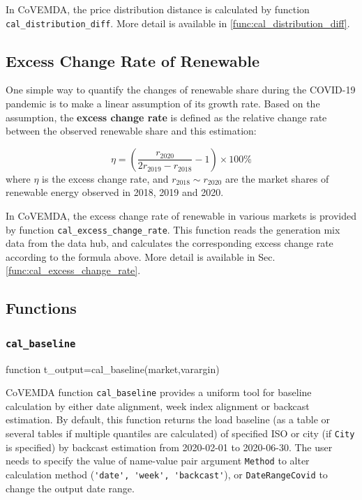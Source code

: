 \documentclass[10pt]{article}
\newcommand{\covemda}{CoVEMDA}
\numberwithin{equation}{section}
\numberwithin{table}{section}
\numberwithin{figure}{section}
\begin{document}
In \covemda{}, the price distribution distance is calculated by function \verb!cal_distribution_diff!. More detail is available in \ref{func:cal_distribution_diff}.

\subsection{Excess Change Rate of Renewable}\label{subsec:excess_change_rate}

One simple way to quantify the changes of renewable share during the COVID-19 pandemic is to make a linear assumption of its growth rate. Based on the assumption, the \textbf{excess change rate} is defined as the relative change rate between the observed renewable share and this estimation:

\begin{equation*}
    \eta=\left(\frac{r_{2020}}{2r_{2019}-r_{2018}}-1\right)\times100\%
\end{equation*}
where $\eta$ is the excess change rate, and $r_{2018}\sim r_{2020}$ are the market shares of renewable energy observed in 2018, 2019 and 2020.

In \covemda{}, the excess change rate of renewable in various markets is provided by function \verb!cal_excess_change_rate!. This function reads the generation mix data from the data hub, and calculates the corresponding excess change rate according to the formula above. More detail is available in Sec.\ref{func:cal_excess_change_rate}.



\subsection{Functions}

\subsubsection{\texttt{cal\_baseline}}\label{func:cal_baseline}

\begin{Code}
function t_output=cal_baseline(market,varargin)
\end{Code}

\covemda{} function \verb!cal_baseline! provides a uniform tool for baseline calculation by either date alignment, week index alignment or backcast estimation. By default, this function returns the load baseline (as a table or several tables if multiple quantiles are calculated) of specified ISO or city (if \verb!City! is specified) by backcast estimation from 2020-02-01 to 2020-06-30. The user needs to specify the value of name-value pair argument \verb!Method! to alter calculation method (\verb!'date', 'week', 'backcast'!), or \verb!DateRangeCovid! to change the output date range.
\end{document}
